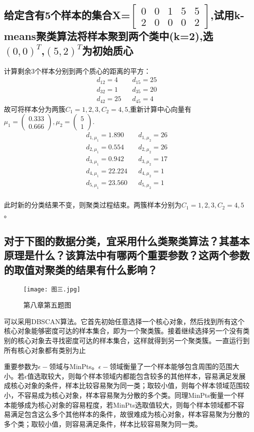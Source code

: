 \documentclass{ctexart}
\begin{document}
\subsection*{给定含有5个样本的集合X=$\begin{bmatrix}
0&0&1&5&5\\2&0&0&0&2
\end{bmatrix}$,试用k-means聚类算法将样本聚到两个类中(k=2),选$(0,0)^T$,$(5,2)^T$为初始质心}
计算剩余3个样本分别到两个质心的距离的平方：
\begin{align*}
d_{12}=4&&d_{15}=25\\
d_{32}=1&&d_{35}=20\\
d_{42}=25&&d_{45}=4
\end{align*}
故可将样本分为两簇$C_1={1,2,3},C_2={4,5}$,重新计算中心向量有$\mu_1=\left(\begin{array}{c}0.333\\0.666\end{array}\right),\mu_2=\left(\begin{array}{c}5\\1\end{array}\right)$.
\begin{align*}
d_{1,\mu_1}=1.890&&d_{1,\mu_2}=26\\
d_{2,\mu_1}=0.554&&d_{2,\mu_2}=26\\
d_{3,\mu_1}=0.942&&d_{3,\mu_2}=17\\
d_{4,\mu_1}=22.224&&d_{4,\mu_2}=1\\
d_{5,\mu_1}=23.560&&d_{5,\mu_2}=1\\
\end{align*}

此时新的分类结果不变，则聚类过程结束。两簇样本分别为$C_1={1,2,3},C_2={4,5}$。

\subsection*{对于下图的数据分类，宜采用什么类聚类算法？其基本原理是什么？该算法中有哪两个重要参数？这两个参数的取值对聚类的结果有什么影响？}

\begin{figure}[H]
\centerline{\texttt{[image: 图三.jpg]}}
\caption{第八章第五题图}
\end{figure}

可以采用DBSCAN算法。它首先初始任意选择一个核心对象，然后找到所有这个核心对象能够密度可达的样本集合，即为一个聚类簇。接着继续选择另一个没有类别的核心对象去寻找密度可达的样本集合，这样就得到另一个聚类簇。一直运行到所有核心对象都有类别为止

重要参数为$\epsilon-$领域与MinPts。$\epsilon-$领域衡量了一个样本能够包含周围的范围大小。若$\epsilon$值选取较大，则每个样本领域内都能包含较多的其他样本，容易满足发展成核心对象的条件，样本比较容易聚为同一类；取较小值，则每个样本领域范围较小，不容易成为核心对象，样本容易聚为分散的多个类。同理MinPts衡量一个样本能够成为核心对象的容易程度，若MinPts选取值较大，则每个样本领域都不容易满足包含这么多个其他样本的条件，故很难成为核心对象，样本容易聚为分散的多个类；取较小值，则容易满足条件，样本比较容易聚为同一类。
\end{document}
